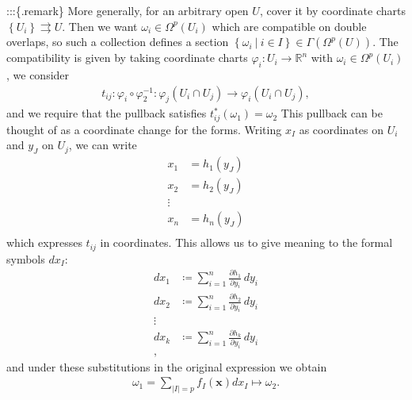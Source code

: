:::\{.remark\} More generally, for an arbitrary open \(U\), cover it by
coordinate charts \(\left\{{ U_i }\right\} \rightrightarrows U\). Then
we want \(\omega_i \in \Omega^p(U_i)\) which are compatible on double
overlaps, so such a collection defines a section
\(\left\{{ \omega_i {~\mathrel{\Big|}~}i\in I }\right\} \in \Gamma( \Omega^p(U) )\).
The compatibility is given by taking coordinate charts
\(\varphi_i: U_i \to {\mathbb{R}}^n\) with
\(\omega_i \in \Omega^p(U_i)\), we consider
\begin{align*}
t_{ij}: \varphi_i \circ \varphi_2 ^{-1} : \varphi_j(U_i \cap U_j) \to \varphi_i( U_i \cap U_j)
,\end{align*}
and we require that the pullback satisfies
\(t_{ij}^*(\omega_1) = \omega_2\) This pullback can be thought of as a
coordinate change for the forms. Writing \(x_I\) as coordinates on
\(U_i\) and \(y_J\) on \(U_j\), we can write
\begin{align*}
x_1 &= h_1(y_J) \\
x_2 &= h_2(y_J) \\
\vdots& \\
x_n &= h_n(y_J) \\
\end{align*}
which expresses \(t_{ij}\) in coordinates. This allows us to give
meaning to the formal symbols \(dx_I\):
\begin{align*}
dx_1 &\coloneqq\sum_{i=1}^n {\frac{\partial h_1}{\partial y_i}\,} dy_i \\
dx_2 &\coloneqq\sum_{i=1}^n {\frac{\partial h_2}{\partial y_i}\,} dy_i \\
\vdots& \\
dx_k &\coloneqq\sum_{i=1}^n {\frac{\partial h_k}{\partial y_i}\,} dy_i \\
,\end{align*}
and under these substitutions in the original expression we obtain
\begin{align*} 
\omega_1 = \sum_{{\left\lvert {I} \right\rvert} = p} f_I(\mathbf{x}) dx_I \mapsto \omega_2
.\end{align*}


